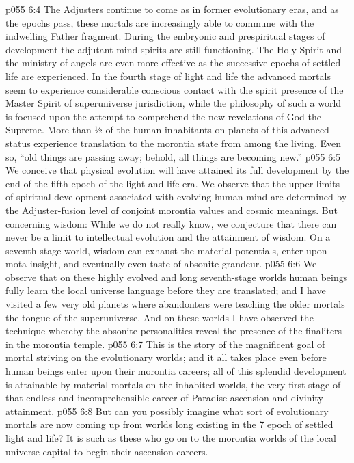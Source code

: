 \vs p055 6:4 \pc The Adjusters continue to come as in former evolutionary eras, and as the epochs pass, these mortals are increasingly able to commune with the indwelling Father fragment. During the embryonic and prespiritual stages of development the adjutant mind\hyp{}spirits are still functioning. The Holy Spirit and the ministry of angels are even more effective as the successive epochs of settled life are experienced. In the fourth stage of light and life the advanced mortals seem to experience considerable conscious contact with the spirit presence of the Master Spirit of superuniverse jurisdiction, while the philosophy of such a world is focused upon the attempt to comprehend the new revelations of God the Supreme. More than ½ of the human inhabitants on planets of this advanced status experience translation to the morontia state from among the living. Even so, “old things are passing away; behold, all things are becoming new.”
\vs p055 6:5 We conceive that physical evolution will have attained its full development by the end of the fifth epoch of the light\hyp{}and\hyp{}life era. We observe that the upper limits of spiritual development associated with evolving human mind are determined by the Adjuster\hyp{}fusion level of conjoint morontia values and cosmic meanings. But concerning wisdom: While we do not really know, we conjecture that there can never be a limit to intellectual evolution and the attainment of wisdom. On a seventh\hyp{}stage world, wisdom can exhaust the material potentials, enter upon mota insight, and eventually even taste of absonite grandeur.
\vs p055 6:6 We observe that on these highly evolved and long seventh\hyp{}stage worlds human beings fully learn the local universe language before they are translated; and I have visited a few very old planets where abandonters were teaching the older mortals the tongue of the superuniverse. And on these worlds I have observed the technique whereby the absonite personalities reveal the presence of the finaliters in the morontia temple.
\vs p055 6:7 \pc This is the story of the magnificent goal of mortal striving on the evolutionary worlds; and it all takes place even before human beings enter upon their morontia careers; all of this splendid development is attainable by material mortals on the inhabited worlds, the very first stage of that endless and incomprehensible career of Paradise ascension and divinity attainment.
\vs p055 6:8 But can you possibly imagine what sort of evolutionary mortals are now coming up from worlds long existing in the 7 epoch of settled light and life? It is such as these who go on to the morontia worlds of the local universe capital to begin their ascension careers.
